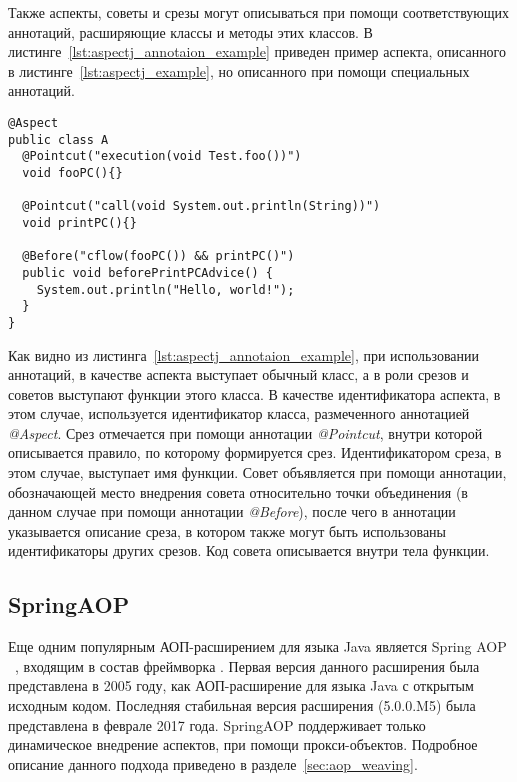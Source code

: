 Также аспекты, советы и срезы могут описываться при помощи соответствующих
аннотаций, расширяющие классы и методы этих классов.
В листинге~\ref{lst:aspectj_annotaion_example} приведен пример аспекта,
описанного в листинге~\ref{lst:aspectj_example}, но описанного при помощи
специальных аннотаций.
  \begin{lstlisting}[style={java}, label={lst:aspectj_annotaion_example}, 
  caption={Пример описания аспектов в AspectJ при помощи аннотаций}]
@Aspect
public class A
  @Pointcut("execution(void Test.foo())")
  void fooPC(){}

  @Pointcut("call(void System.out.println(String))")
  void printPC(){}

  @Before("cflow(fooPC()) && printPC()")
  public void beforePrintPCAdvice() {
    System.out.println("Hello, world!");
  }
}
\end{lstlisting}

Как видно из листинга~\ref{lst:aspectj_annotaion_example}, при использовании
аннотаций, в качестве аспекта выступает обычный класс, а в роли срезов и советов
выступают функции этого класса.
В качестве идентификатора аспекта, в этом случае, используется идентификатор
класса, размеченного аннотацией \textit{@Aspect}.
Срез отмечается при помощи аннотации \textit{@Pointcut}, внутри которой
описывается правило, по которому формируется срез.
Идентификатором среза, в этом случае, выступает имя функции.
Совет объявляется при помощи аннотации, обозначающей место внедрения совета
относительно точки объединения (в данном случае при помощи аннотации
\textit{@Before}), после чего в аннотации указывается описание среза, в котором
также могут быть использованы идентификаторы других срезов.
Код совета описывается внутри тела функции.
\subsection{SpringAOP}
\label{sub:spring_aop_overwiev}
Еще одним популярным АОП-расширением для языка Java является Spring AOP
~\cite{spring_aop}, входящим в состав фреймворка .
Первая версия данного расширения была представлена в 2005 году, как
АОП-расширение для языка Java с открытым исходным кодом.
Последняя стабильная версия расширения (5.0.0.M5) была представлена в феврале
2017 года.
SpringAOP поддерживает только динамическое внедрение аспектов, при помощи
прокси-объектов.
Подробное описание данного подхода приведено в разделе~\ref{sec:aop_weaving}.

